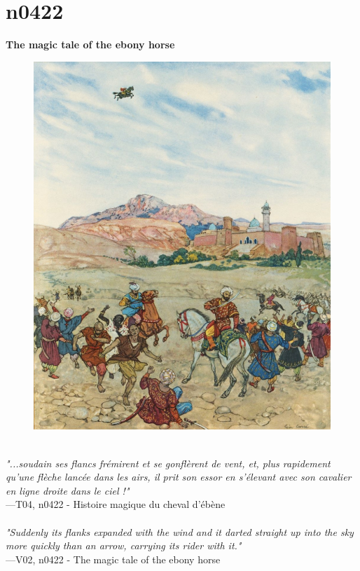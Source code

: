\documentclass[../Carre_nights.tex]{subfiles}
\begin{document}
\newpage

\section{n0422}
\textbf{\Large{The magic tale of the ebony horse}} \\

\begin{figure}[ht]
\centering
\includegraphics[height=\figsize]{illustrations/volume_4/T04, n0422 - Histoire magique du cheval d'ébène.jpg}
\end{figure}

\textit{\\
"...soudain ses flancs frémirent et se gonflèrent de vent, et, plus rapidement qu’une flèche lancée dans les airs, il prit son essor en s’élevant avec son cavalier en ligne droite dans le ciel !"} \\
—T04, n0422 - Histoire magique du cheval d'ébène \\~\\
\textit{"Suddenly its flanks expanded with the wind and it darted straight up into the sky more quickly than an arrow, carrying its rider with it."} \\
—V02, n0422 - The magic tale of the ebony horse
\end{document}
